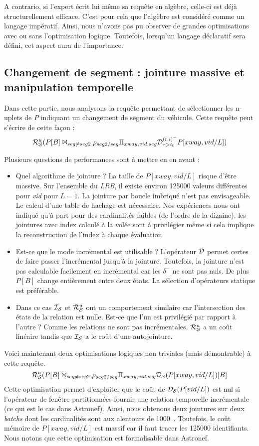A contrario, si l'expert écrit lui même sa requête en algèbre, celle-ci est déjà structurellement efficace. C'est pour cela que l'algèbre est considéré comme un langage impératif. Ainsi, nous n'avons pas pu observer de grandes optimisations avec ou sans l'optimisation logique. Toutefois, lorsqu'un langage déclaratif sera défini, cet aspect aura de l'importance.

\subsection{Changement de segment : jointure massive et manipulation temporelle}
Dans cette partie, nous analysons la requête permettant de sélectionner les n-uplets de $P$ indiquant un changement de segment du véhicule. Cette requête peut s'écrire de cette façon : $$\mathcal{R}_{\mathcal S}^{u}(P[B] \Join_{seg\neq seg2} \rho_{seg2/seg} \Pi_{xway,vid,seg} \mathcal{D}^{(t,i)^-}_{\tau>t_0} P[xway,vid/L])$$

Plusieurs questions de performances sont à mettre en en avant :
\begin{itemize}
	\item Quel algorithme de jointure ? La taille de $P[xway,vid/L]$ risque d'être massive. Sur l'ensemble du \textit{LRB}, il existe environ 125000 valeurs différentes pour \textit{vid} pour $L=1$. La jointure par boucle imbriqué n'est pas envisageable. Le calcul d'une table de hachage est nécessaire. Nos expériences nous ont indiqué qu'à part pour des cardinalités faibles (de l'ordre de la dizaine), les jointures avec index calculé à la volée sont à privilégier même si cela implique la reconstruction de l'index à chaque évaluation.
	\item Est-ce que le mode incrémental est utilisable ? L'opérateur $\mathcal{D}$ permet certes de faire passer l'incrémental jusqu'à la jointure. Toutefois, la jointure n'est pas calculable facilement en incrémental car les $\delta^-$ ne sont pas nuls. De plus $P[B]$ change entièrement entre deux états. La sélection d'opérateurs statique est préférable.
	\item Dans ce cas $\mathcal{I_S}$ et $\mathcal{R}_{\mathcal S}^{u}$ ont un comportement similaire car l'intersection des états de la relation est nulle. Est-ce que l'un est privilégié par rapport à l'autre ? Comme les relations ne sont pas incrémentales, $\mathcal{R}_{\mathcal S}^{u}$ a un coût linéaire tandis que $\mathcal{I_S}$ a le coût d'une autojointure.
\end{itemize}

Voici maintenant deux optimisations logiques non triviales (mais démontrable) à cette requête.
$$\mathcal{R}_{\mathcal S}^{u}(P[B] \Join_{seg\neq seg2} \rho_{seg2/seg} \Pi_{xway,vid,seg} \mathcal{D_S}(P[xway,vid/L])[B]$$
Cette optimisation permet d'exploiter que le coût de $\mathcal{D_S}(P[vid/L])$ est nul si l'opérateur de fenêtre partitionnées fournir une relation temporelle incrémentale (ce qui est le cas dans Astronef). Ainsi, nous obtenons deux jointures sur deux \textit{batchs} dont les cardinalités sont aux alentours de 1000~\cite{Jain:lrb}. Toutefois, le coût mémoire de $P[xway,vid/L]$ est massif car il faut tracer les 125000 identifiants. Nous notons que cette optimisation est formalisable dans Astronef.

